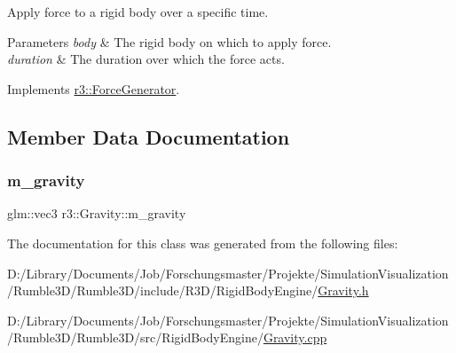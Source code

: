 Apply force to a rigid body over a specific time. 


\begin{DoxyParams}{Parameters}
{\em body} & The rigid body on which to apply force. \\
\hline
{\em duration} & The duration over which the force acts. \\
\hline
\end{DoxyParams}


Implements \mbox{\hyperlink{classr3_1_1_force_generator_a69bebbde8cef792d6636af50037af2aa}{r3\+::\+Force\+Generator}}.



\subsection{Member Data Documentation}
\mbox{\label{classr3_1_1_gravity_a2feb1d84fc4118e6e30b707a7224f6ef}} 
\subsubsection{\texorpdfstring{m\+\_\+gravity}{m\_gravity}}
{\footnotesize\ttfamily glm\+::vec3 r3\+::\+Gravity\+::m\+\_\+gravity\hspace{0.3cm}{\ttfamily [protected]}}



The documentation for this class was generated from the following files\+:\begin{DoxyCompactItemize}
\item 
D\+:/\+Library/\+Documents/\+Job/\+Forschungsmaster/\+Projekte/\+Simulation\+Visualization/\+Rumble3\+D/\+Rumble3\+D/include/\+R3\+D/\+Rigid\+Body\+Engine/\mbox{\hyperlink{_gravity_8h}{Gravity.\+h}}\item 
D\+:/\+Library/\+Documents/\+Job/\+Forschungsmaster/\+Projekte/\+Simulation\+Visualization/\+Rumble3\+D/\+Rumble3\+D/src/\+Rigid\+Body\+Engine/\mbox{\hyperlink{_gravity_8cpp}{Gravity.\+cpp}}\end{DoxyCompactItemize}
